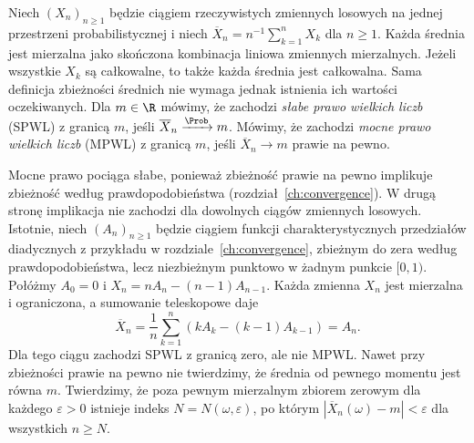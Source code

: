 \begin{definicja}
Niech $(X_n)_{n\geq1}$ będzie ciągiem rzeczywistych
zmiennych losowych na jednej przestrzeni
probabilistycznej i niech
$\overline X_n=n^{-1}\sum_{k=1}^nX_k$ dla $n\geq1$.
Każda średnia jest mierzalna jako skończona kombinacja
liniowa zmiennych mierzalnych. Jeżeli wszystkie $X_k$
są całkowalne, to także każda średnia jest całkowalna.
Sama definicja zbieżności średnich nie wymaga jednak
istnienia ich wartości oczekiwanych.
Dla $m\in\R$ mówimy, że zachodzi \emph{słabe prawo
wielkich liczb} (SPWL) z granicą $m$, jeśli
$\overline X_n\xrightarrow{\Prob}m$.
Mówimy, że zachodzi \emph{mocne prawo wielkich liczb}
(MPWL) z granicą $m$, jeśli
$\overline X_n\to m$ prawie na pewno.
\end{definicja}

Mocne prawo pociąga słabe, ponieważ zbieżność prawie na
pewno implikuje zbieżność według prawdopodobieństwa
(rozdział~\ref{ch:convergence}).
W drugą stronę implikacja nie zachodzi dla dowolnych ciągów
zmiennych losowych. Istotnie, niech $(A_n)_{n\geq1}$
będzie ciągiem funkcji charakterystycznych przedziałów
diadycznych z przykładu w rozdziale~\ref{ch:convergence},
zbieżnym do zera według prawdopodobieństwa, lecz
niezbieżnym punktowo w żadnym punkcie $[0,1)$.
Połóżmy $A_0=0$ i $X_n=nA_n-(n-1)A_{n-1}$.
Każda zmienna $X_n$ jest mierzalna i ograniczona,
a sumowanie teleskopowe daje
\[
\overline X_n=\frac1n\sum_{k=1}^n
(kA_k-(k-1)A_{k-1})=A_n.
\]
Dla tego ciągu zachodzi SPWL z granicą zero, ale nie MPWL.
Nawet przy zbieżności prawie na pewno nie twierdzimy,
że średnia od pewnego momentu jest równa $m$.
Twierdzimy, że poza pewnym mierzalnym zbiorem zerowym
dla każdego $\varepsilon>0$ istnieje indeks
$N=N(\omega,\varepsilon)$, po którym
$|\overline X_n(\omega)-m|<\varepsilon$ dla wszystkich
$n\geq N$.

